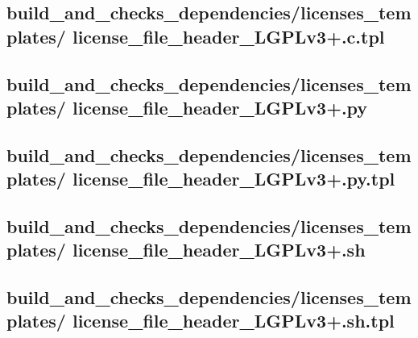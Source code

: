 \documentclass{article}
\begin{document}


\subsection{
  build\_and\_checks\_dependencies/licenses\_templates/%
license\_file\_header\_LGPLv3+.c.tpl
}
\label{
  build_and_checks_dependencies:licenses_templates:%
license_file_header_LGPLv3+ctpl
}



\subsection{
  build\_and\_checks\_dependencies/licenses\_templates/%
license\_file\_header\_LGPLv3+.py
}
\label{
  build_and_checks_dependencies:licenses_templates:%
license_file_header_LGPLv3+py
}



\subsection{
  build\_and\_checks\_dependencies/licenses\_templates/%
license\_file\_header\_LGPLv3+.py.tpl
}
\label{
  build_and_checks_dependencies:licenses_templates:%
license_file_header_LGPLv3+pytpl
}



\subsection{
  build\_and\_checks\_dependencies/licenses\_templates/%
license\_file\_header\_LGPLv3+.sh
}
\label{
  build_and_checks_dependencies:licenses_templates:%
license_file_header_LGPLv3+sh
}



\subsection{
  build\_and\_checks\_dependencies/licenses\_templates/%
license\_file\_header\_LGPLv3+.sh.tpl
}
\label{
  build_and_checks_dependencies:licenses_templates:%
license_file_header_LGPLv3+shtpl
}
\end{document}
